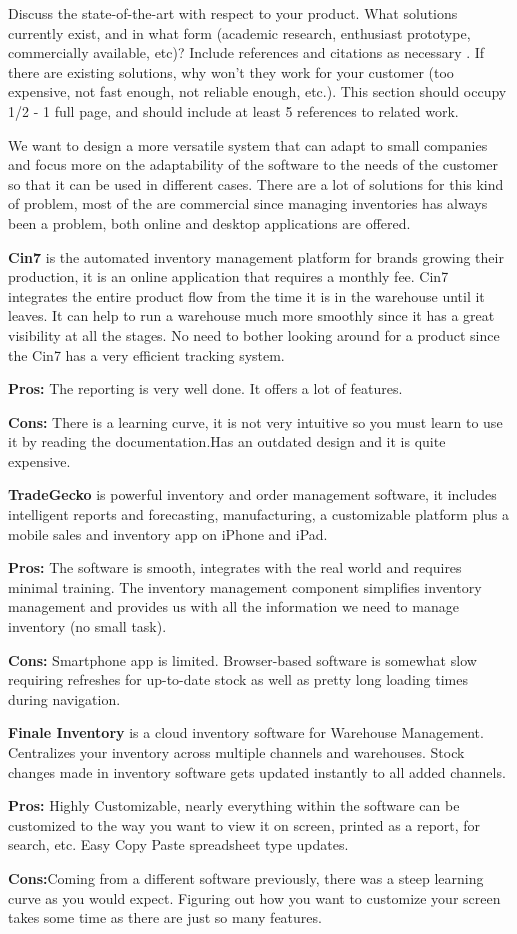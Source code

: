 Discuss the state-of-the-art with respect to your product. What solutions currently exist, and in what form (academic research, enthusiast prototype, commercially available, etc)? Include references and citations as necessary \cite{Rubin2012}. If there are existing solutions, why won't they work for your customer (too expensive, not fast enough, not reliable enough, etc.). This section should occupy 1/2 - 1 full page, and should include at least 5 references to related work.

We want to design a more versatile system that can adapt to small companies and focus more on the adaptability of the software to the needs of the customer so that it can be used in different cases. There are a lot of  solutions for this kind of problem, most of the are commercial since managing inventories has always been a problem, both online and desktop applications are offered.

\textbf{Cin7} is the automated inventory management platform for brands growing their production, it is an online application that requires a monthly fee.
Cin7 integrates the entire product flow from the time it is in the warehouse until it leaves. It can help to run a warehouse much more smoothly since it has a great visibility at all the stages. No need to bother looking around for a product since the Cin7 has a very efficient tracking system.

\textbf{Pros:} The reporting is very well done. It offers a lot of features.

\textbf{Cons:} There is a learning curve, it is not very intuitive so you must learn to use it by reading the documentation.Has an outdated design and it is quite expensive.

\textbf{TradeGecko} is powerful inventory and order management software, it includes intelligent reports and forecasting, manufacturing, a customizable platform plus a mobile sales and inventory app on iPhone and iPad.

\textbf{Pros:} The software is smooth, integrates with the real world and requires minimal training. The inventory management component simplifies inventory management and provides us with all the information we need to manage inventory (no small task).

\textbf{Cons:} Smartphone app is limited. Browser-based software is somewhat slow requiring refreshes for up-to-date stock as well as pretty long loading times during navigation.

\textbf{Finale Inventory} is a cloud inventory software for Warehouse Management. Centralizes your inventory across multiple channels and warehouses. Stock changes made in inventory software gets updated instantly to all added channels.

\textbf{Pros:} Highly Customizable, nearly everything within the software can be customized to the way you want to view it on screen, printed as a report, for search, etc. Easy Copy Paste spreadsheet type updates.

\textbf{Cons:}Coming from a different software previously, there was a steep learning curve as you would expect. Figuring out how you want to customize your screen takes some time as there are just so many features. 
